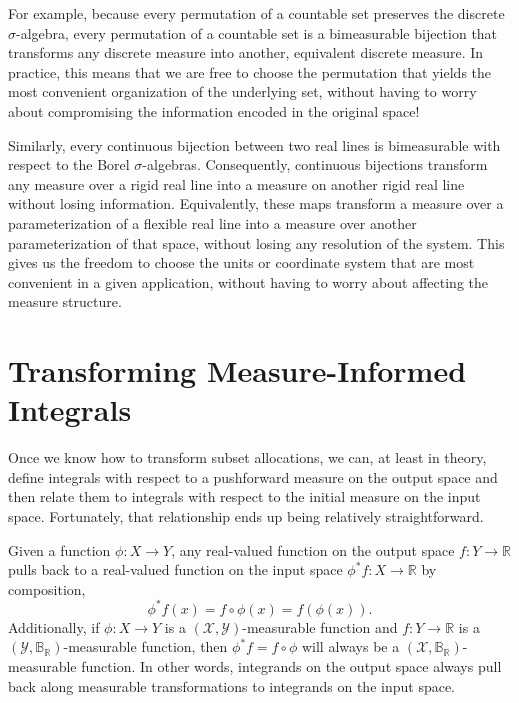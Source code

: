 \documentclass[
  letterpaper,
  DIV=11,
  numbers=noendperiod]{scrartcl}
\begin{document}
For example, because every permutation of a countable set preserves the
discrete \(\sigma\)-algebra, every permutation of a countable set is a
bimeasurable bijection that transforms any discrete measure into
another, equivalent discrete measure. In practice, this means that we
are free to choose the permutation that yields the most convenient
organization of the underlying set, without having to worry about
compromising the information encoded in the original space!

Similarly, every continuous bijection between two real lines is
bimeasurable with respect to the Borel \(\sigma\)-algebras.
Consequently, continuous bijections transform any measure over a rigid
real line into a measure on another rigid real line without losing
information. Equivalently, these maps transform a measure over a
parameterization of a flexible real line into a measure over another
parameterization of that space, without losing any resolution of the
system. This gives us the freedom to choose the units or coordinate
system that are most convenient in a given application, without having
to worry about affecting the measure structure.

\section{Transforming Measure-Informed
Integrals}\label{sec:transforming-integrals}

Once we know how to transform subset allocations, we can, at least in
theory, define integrals with respect to a pushforward measure on the
output space and then relate them to integrals with respect to the
initial measure on the input space. Fortunately, that relationship ends
up being relatively straightforward.

Given a function \(\phi : X \rightarrow Y\), any real-valued function on
the output space \(f : Y \rightarrow \mathbb{R}\) pulls back to a
real-valued function on the input space
\(\phi^{*} f : X \rightarrow \mathbb{R}\) by composition, \[
\phi^{*} f(x) = f \circ \phi (x) = f(\phi(x)).
\] Additionally, if \(\phi : X \rightarrow Y\) is a
\((\mathcal{X}, \mathcal{Y})\)-measurable function and
\(f : Y \rightarrow \mathbb{R}\) is a
\((\mathcal{Y}, \mathbb{B}_{\mathbb{R}})\)-measurable function, then
\(\phi^{*} f = f \circ \phi\) will always be a
\((\mathcal{X}, \mathbb{B}_{\mathbb{R}})\)-measurable function. In other
words, integrands on the output space always pull back along measurable
transformations to integrands on the input space.
\end{document}
